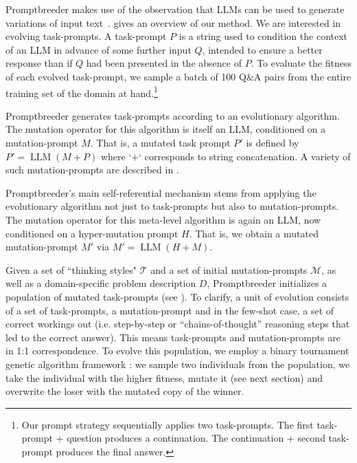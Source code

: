 \documentclass{article} %
\DeclareMathOperator{\LLM}{LLM}
\begin{document}
Promptbreeder makes use of the observation that LLMs can be used to generate variations of input text~\citep{DBLP:journals/corr/abs-2206-08896,DBLP:journals/corr/abs-2302-12170,DBLP:journals/corr/abs-2302-14838}.   gives an overview of our method. We are interested in evolving task-prompts. A task-prompt $P$ is a string used to condition the context of an LLM in advance of some further input $Q$, intended to ensure a better response than if $Q$ had been presented in the absence of $P$. To evaluate the fitness of each evolved task-prompt, we sample a batch of 100 Q\&A pairs from the entire training set of the domain at hand.\footnote{Our prompt strategy sequentially applies two task-prompts. The first task-prompt + question produces a continuation. The continuation + second task-prompt produces the final answer.} 

Promptbreeder generates task-prompts according to an evolutionary algorithm. The mutation operator for this algorithm is itself an LLM, conditioned on a mutation-prompt $M$. That is, a mutated task prompt $P'$ is defined by $P' = \LLM(M + P)$ where `$+$` corresponds to string concatenation. A variety of such mutation-prompts are described in . 

Promptbreeder's main self-referential mechanism stems from applying the evolutionary algorithm not just to task-prompts but also to mutation-prompts. The mutation operator for this meta-level algorithm is again an LLM, now conditioned on a hyper-mutation prompt $H$. That is, we obtain a mutated mutation-prompt $M'$ via $M' = \LLM(H + M)$. 

Given a set of ``thinking styles" $\mathcal{T}$ and a set of initial mutation-prompts $\mathcal{M}$, as well as a domain-specific problem description $D$, Promptbreeder initializes a population of mutated task-prompts (see ). To clarify, a unit of evolution consists of a set of task-prompts, a mutation-prompt and in the few-shot case, a set of correct workings out (i.e. step-by-step or ``chains-of-thought'' reasoning steps that led to the correct answer). This means task-prompts and mutation-prompts are in 1:1 correspondence. To evolve this population, we employ a binary tournament genetic algorithm framework \citep{harvey2011microbial}: we sample two individuals from the population, we take the individual with the higher fitness, mutate it (see next section) and overwrite the loser with the mutated copy of the winner.
 
\end{document}
